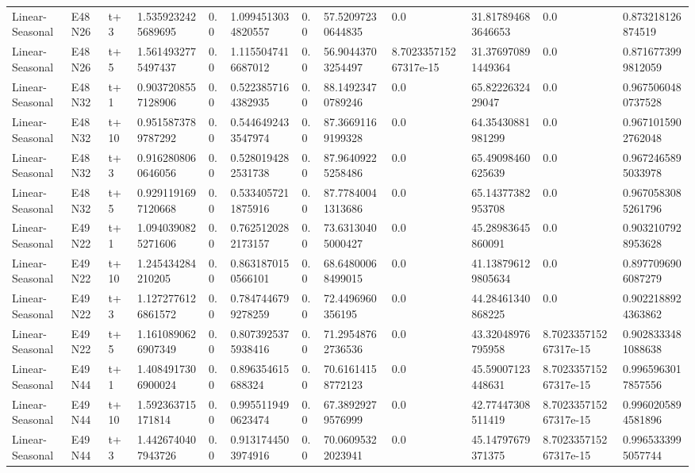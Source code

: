 \begin{landscape}
\begin{longtable}{llllllllllll}
Linear-Seasonal & E48N26 & t+3 & 1.5359232425689695 & 0.0 & 1.0994513034820557 & 0.0 & 57.52097230644835 & 0.0 & 31.817894683646653 & 0.0 & 0.873218126874519 \\
Linear-Seasonal & E48N26 & t+5 & 1.5614932775497437 & 0.0 & 1.1155047416687012 & 0.0 & 56.90443703254497 & 8.702335715267317e-15 & 31.376970891449364 & 0.0 & 0.8716773999812059 \\
Linear-Seasonal & E48N32 & t+1 & 0.9037208557128906 & 0.0 & 0.5223857164382935 & 0.0 & 88.14923470789246 & 0.0 & 65.8222632429047 & 0.0 & 0.9675060480737528 \\
Linear-Seasonal & E48N32 & t+10 & 0.9515873789787292 & 0.0 & 0.5446492433547974 & 0.0 & 87.36691169199328 & 0.0 & 64.35430881981299 & 0.0 & 0.9671015902762048 \\
Linear-Seasonal & E48N32 & t+3 & 0.9162808060646056 & 0.0 & 0.5280194282531738 & 0.0 & 87.96409225258486 & 0.0 & 65.49098460625639 & 0.0 & 0.9672465895033978 \\
Linear-Seasonal & E48N32 & t+5 & 0.9291191697120668 & 0.0 & 0.5334057211875916 & 0.0 & 87.77840041313686 & 0.0 & 65.14377382953708 & 0.0 & 0.9670583085261796 \\
Linear-Seasonal & E49N22 & t+1 & 1.0940390825271606 & 0.0 & 0.7625120282173157 & 0.0 & 73.63130405000427 & 0.0 & 45.28983645860091 & 0.0 & 0.9032107928953628 \\
Linear-Seasonal & E49N22 & t+10 & 1.245434284210205 & 0.0 & 0.8631870150566101 & 0.0 & 68.64800068499015 & 0.0 & 41.138796129805634 & 0.0 & 0.8977096906087279 \\
Linear-Seasonal & E49N22 & t+3 & 1.1272776126861572 & 0.0 & 0.7847446799278259 & 0.0 & 72.4496960356195 & 0.0 & 44.28461340868225 & 0.0 & 0.9022188924363862 \\
Linear-Seasonal & E49N22 & t+5 & 1.1610890626907349 & 0.0 & 0.8073925375938416 & 0.0 & 71.29548762736536 & 0.0 & 43.32048976795958 & 8.702335715267317e-15 & 0.9028333481088638 \\
Linear-Seasonal & E49N44 & t+1 & 1.4084917306900024 & 0.0 & 0.896354615688324 & 0.0 & 70.61614158772123 & 0.0 & 45.59007123448631 & 8.702335715267317e-15 & 0.9965963017857556 \\
Linear-Seasonal & E49N44 & t+10 & 1.592363715171814 & 0.0 & 0.9955119490623474 & 0.0 & 67.38929279576999 & 0.0 & 42.77447308511419 & 8.702335715267317e-15 & 0.9960205894581896 \\
Linear-Seasonal & E49N44 & t+3 & 1.4426740407943726 & 0.0 & 0.9131744503974916 & 0.0 & 70.06095322023941 & 0.0 & 45.14797679371375 & 8.702335715267317e-15 & 0.9965333995057744 \\

\end{longtable}
\end{landscape}
